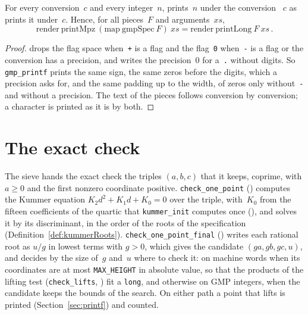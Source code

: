 \begin{lemma}\label{lem:Printf.printMpz_gmpSpec}
  \leanok
  For every conversion~$c$ and every integer~$n$,  prints~$n$ under
  the conversion ~$c$ as 
  prints it under~$c$. Hence, for all pieces~$F$ and arguments~$\mathit{xs}$,
  \[
    \mathrm{render}\ \mathrm{printMpz}\ (\mathrm{map}\ \mathrm{gmpSpec}\ F)\ \mathit{xs}
      = \mathrm{render}\ \mathrm{printLong}\ F\ \mathit{xs}\,.
  \]
\end{lemma}

\begin{proof}
  \leanok
   drops the flag space when~\texttt{+} is a flag and the
  flag~\texttt{0} when~\texttt{-} is a flag or the conversion has a precision, and writes the
  precision~$0$ for a~\texttt{.} without digits. So \texttt{gmp\_printf} prints the same sign, the
  same zeros before the digits, which a precision asks for, and the same padding up to the width,
  of zeros only without~\texttt{-} and without a precision. The text of the pieces follows
  conversion by conversion; a character is printed as it is by both.
\end{proof}

\section{The exact check}\label{sec:check}

The sieve hands the exact check the triples $(a, b, c)$ that it keeps, coprime, with $a \ge 0$ and
the first nonzero coordinate positive. \texttt{check\_one\_point}
() computes the Kummer equation $K_2 d^2 + K_1 d + K_0 = 0$ over the
triple, with~$K_0$ from the fifteen coefficients of the quartic that \texttt{kummer\_init} computes
once (), and solves it by its discriminant, in the order of the
roots of the specification (Definition~\ref{def:kummerRoots}). \texttt{check\_one\_point\_final}
() writes each rational root as $u/g$ in lowest terms with $g > 0$,
which gives the candidate $(ga, gb, gc, u)$, and decides by the size of~$g$ and~$u$ where to check
it: on machine words when its coordinates are at most \texttt{MAX\_HEIGHT} in absolute value, so
that the products of the lifting test (\texttt{check\_lifts}, ) fit
a \texttt{long}, and otherwise on GMP integers, when the candidate keeps the bounds of the search.
On either path a point that lifts is printed (Section~\ref{sec:printf}) and counted.

